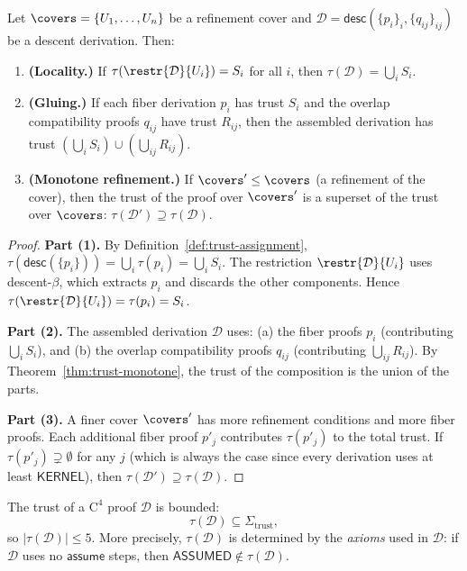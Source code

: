 \begin{theorem}
\label{thm:trust-sheaf}
Let $\covers = \{U_1, \ldots, U_n\}$ be a refinement cover and
$\mathcal{D} = \mathsf{desc}(\{p_i\}_i, \{q_{ij}\}_{ij})$ be a descent
derivation.  Then:
\begin{enumerate}
\item \textbf{(Locality.)} If $\tau(\restr{\mathcal{D}}{U_i}) = S_i$
  for all $i$, then $\tau(\mathcal{D}) = \bigcup_i S_i$.
\item \textbf{(Gluing.)} If each fiber derivation $p_i$ has trust $S_i$
  and the overlap compatibility proofs $q_{ij}$ have trust $R_{ij}$,
  then the assembled derivation has trust $(\bigcup_i S_i) \cup (\bigcup_{ij} R_{ij})$.
\item \textbf{(Monotone refinement.)} If $\covers' \leq \covers$
  (a refinement of the cover), then the trust of the proof over $\covers'$
  is a superset of the trust over $\covers$:
  $\tau(\mathcal{D}') \supseteq \tau(\mathcal{D})$.
\end{enumerate}
\end{theorem}

\begin{proof}
\textbf{Part (1).}
By Definition~\ref{def:trust-assignment},
$\tau(\mathsf{desc}(\{p_i\})) = \bigcup_i \tau(p_i) = \bigcup_i S_i$.
The restriction $\restr{\mathcal{D}}{U_i}$ uses descent-$\beta$,
which extracts $p_i$ and discards the other components.
Hence $\tau(\restr{\mathcal{D}}{U_i}) = \tau(p_i) = S_i$.

\textbf{Part (2).}
The assembled derivation $\mathcal{D}$ uses:
(a) the fiber proofs $p_i$ (contributing $\bigcup_i S_i$), and
(b) the overlap compatibility proofs $q_{ij}$ (contributing $\bigcup_{ij} R_{ij}$).
By Theorem~\ref{thm:trust-monotone}, the trust of the composition is
the union of the parts.

\textbf{Part (3).}
A finer cover $\covers'$ has more refinement conditions and more fiber
proofs.  Each additional fiber proof $p'_j$ contributes $\tau(p'_j)$ to
the total trust.  If $\tau(p'_j) \supsetneq \emptyset$ for any $j$
(which is always the case since every derivation uses at least
$\mathsf{KERNEL}$), then $\tau(\mathcal{D}') \supseteq \tau(\mathcal{D})$.
\end{proof}

\begin{corollary}
\label{cor:trust-complexity}
The trust of a $\mathrm{C}^4$ proof $\mathcal{D}$ is bounded:
\[
  \tau(\mathcal{D}) \subseteq \Sigma_{\mathrm{trust}},
\]
so $|\tau(\mathcal{D})| \leq 5$.  More precisely, $\tau(\mathcal{D})$
is determined by the \emph{axioms} used in $\mathcal{D}$: if $\mathcal{D}$
uses no $\mathsf{assume}$ steps, then $\mathsf{ASSUMED} \notin \tau(\mathcal{D})$.
\end{corollary}


